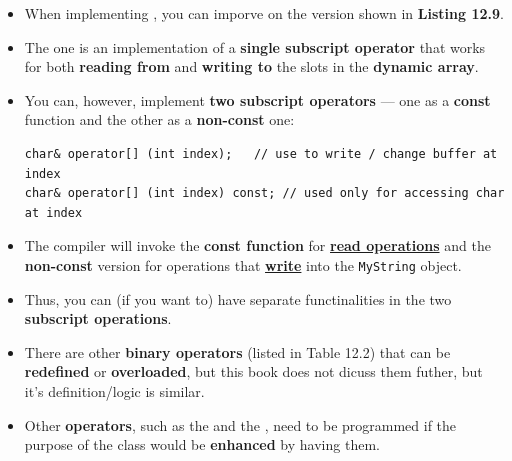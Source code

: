 \documentclass[10pt]{article}
\newcommand{\pbreak}{\vspace{30pt}}
\begin{document}
\begin{itemize}
	\item When implementing \textbf{}, you can imporve on the version shown in \textbf{Listing 12.9}.
	\item The one is an implementation of a \textbf{single subscript operator} that works for both \textbf{reading from} and \textbf{writing to} the slots in the \textbf{dynamic array}.

	\pbreak

	\item You can, however, implement \textbf{two subscript operators} --- one as a \textbf{const} function and the other as a \textbf{non-const} one:
		\begin{verbatim}
char& operator[] (int index);	// use to write / change buffer at index
char& operator[] (int index) const;	// used only for accessing char at index
		\end{verbatim}

	\item The compiler will invoke the \textbf{const function} for \textbf{\underline{read operations}} and the \textbf{non-const} version for operations that \textbf{\underline{write}} into the \verb|MyString| object.

	\item Thus, you can (if you want to) have separate functinalities in the two \textbf{subscript operations}.

		\pbreak

	\item There are other \textbf{binary operators} (listed in Table 12.2) that can be \textbf{redefined} or \textbf{overloaded}, but this book does not dicuss them futher, but it's definition/logic is similar.
\end{itemize}

\pbreak

\begin{itemize}
	\item Other \textbf{operators}, such as the  and the \textbf{}, need to be programmed if the purpose of the class would be \textbf{enhanced} by having them.
\end{itemize}

\newpage
\end{document}
